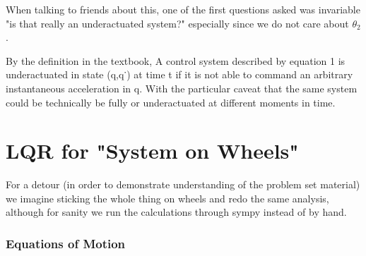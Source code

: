 \documentclass[conference]{IEEEtran}
\begin{document}
When talking to friends about this, one of the first questions asked was
invariable "is that really an underactuated system?" especially since we do not
care about $\theta_2$.

By the definition in the textbook, 
    A control system described by equation 1 is underactuated in state (q,q˙) at
    time t if it is not able to command an arbitrary instantaneous acceleration
    in q.
With the particular caveat that the same system could be technically be fully or underactuated at different moments in time.

\section{LQR for "System on Wheels"}


For a detour (in order to demonstrate understanding of the problem set material)
we imagine sticking the whole thing on wheels and redo the same analysis,
although for sanity we run the calculations through sympy instead of by hand.
\cite{JS-aruco}









\subsubsection{Equations of Motion}
\end{document}
